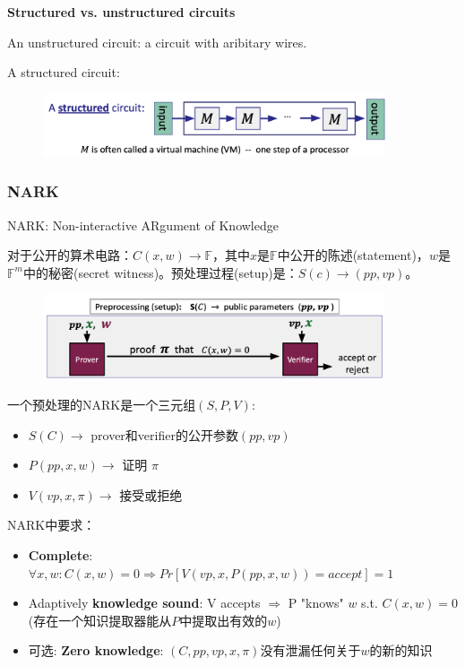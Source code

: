 \documentclass[10pt]{ctexart}
\begin{document}
\textbf{Structured vs. unstructured circuits}

An unstructured circuit: a circuit with aribitary wires.

A structured circuit:
\begin{figure}[H]
    \centering
    \includegraphics[width=0.9\textwidth]{./img/structured_circuit.png} 
\end{figure}

\subsubsection{NARK}
NARK: Non-interactive ARgument of Knowledge

对于公开的算术电路：$C(x,w) \rightarrow \mathbb{F}$，其中$x$是$\mathbb{F}$中公开的陈述(statement)，$w$是$\mathbb{F}^m$中的秘密(secret witness)。预处理过程(setup)是：$S(c) \rightarrow (pp,vp)$。
\begin{figure}[H]
    \centering
    \includegraphics[width=0.9\textwidth]{./img/preprocessing.png} 
\end{figure}
一个预处理的NARK是一个三元组$(S,P,V)$:
\begin{itemize}
	\item $S(C) \rightarrow$ prover和verifier的公开参数$(pp,vp)$
	\item $P(pp,x,w) \rightarrow$ 证明 $\pi$
	\item $V(vp,x,\pi) \rightarrow$ 接受或拒绝
\end{itemize}

NARK中要求：
\begin{itemize}
	\item \textbf{Complete}: $\forall x,w: C(x,w) = 0 \Rightarrow Pr[V(vp,x,P(pp,x,w))=accept] =1$
	\item Adaptively \textbf{knowledge sound}: V accepts $\Rightarrow$ P "knows" $w$ s.t. $C(x,w)=0$ (存在一个知识提取器能从$P$中提取出有效的$w$)
	\item 可选: \textbf{Zero knowledge}: $(C,pp,vp,x,\pi)$没有泄漏任何关于$w$的新的知识
\end{itemize}
\end{document}
